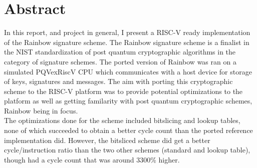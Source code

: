 \section{Abstract}
In this report, and project in general, I present a RISC-V ready implementation of the Rainbow signature scheme. The Rainbow signature scheme is a finalist in the NIST standardization of post quantum cryptographic algorithms in the category of signature schemes. The ported version of Rainbow was ran on a simulated PQVexRiscV CPU which communicates with a host device for storage of keys, signatures and messages. The aim with porting this cryptographic scheme to the RISC-V platform was to provide potential optimizations to the platform as well as getting familarity with post quantum cryptographic schemes, Rainbow being in focus.\medskip\\
The optimizations done for the scheme included bitslicing and lookup tables, none of which succeeded to obtain a better cycle count than the ported reference implementation did. However, the bitsliced scheme did get a better cycle/instruction ratio than the two other schemes (standard and lookup table), though had a cycle count that was around 3300\% higher.
\pagebreak